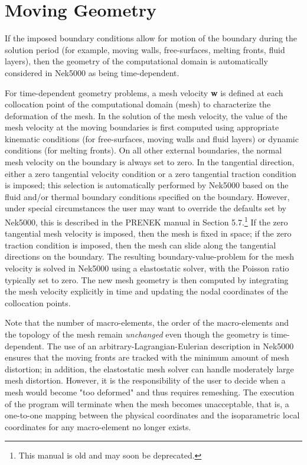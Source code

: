 \section{Moving Geometry}
If the imposed boundary conditions allow for motion
of the boundary during the solution period (for example,
moving walls, free-surfaces, melting fronts, fluid layers),
then the geometry of the computational domain is automatically
considered in Nek5000 as being time-dependent.

For time-dependent geometry problems,
a mesh velocity {\bf w} is defined at each
collocation point of the computational domain (mesh) to
characterize the deformation of the mesh.
In the solution of the mesh velocity, the value of the mesh
velocity at the moving boundaries is first computed
using appropriate kinematic conditions (for free-surfaces, moving walls
and fluid layers) or dynamic conditions (for melting fronts).
On all other external boundaries, the normal mesh velocity on the
boundary is always set to zero.
In the tangential direction, either a zero tangential velocity
condition or a zero tangential traction condition is imposed; this
selection is automatically performed by Nek5000 based on
the fluid and/or thermal boundary conditions specified
on the boundary.
However, under special circumstances the user may want
to override the defaults set by Nek5000, this is
described in the PRENEK manual in Section 5.7.\footnote{This manual is old and may soon be deprecated.}
If the zero tangential mesh velocity is imposed, then the mesh
is fixed in space; if the zero traction condition is imposed,
then the mesh can slide along the tangential directions on
the boundary.
The resulting boundary-value-problem for the mesh velocity is solved
in Nek5000 using a elastostatic solver, with the Poisson ratio
typically set to zero.
The new mesh geometry is then computed by integrating the
mesh velocity explicitly in time and updating the nodal coordinates of the
collocation points.

Note that the number of macro-elements, the order of the macro-elements
and the topology of the mesh remain {\em unchanged} even though
the geometry is time-dependent.
The use of an arbitrary-Lagrangian-Eulerian description in Nek5000
ensures that the moving fronts are tracked with the minimum amount
of mesh distortion;
in addition, the elastostatic mesh solver can handle moderately
large mesh distortion.
However, it is the responsibility of the user to decide when
a mesh would become "too deformed" and thus requires remeshing.
The execution of the program will terminate when the mesh becomes
unacceptable, that is, a one-to-one mapping between the physical
coordinates and the isoparametric local coordinates for any
macro-element no longer exists.